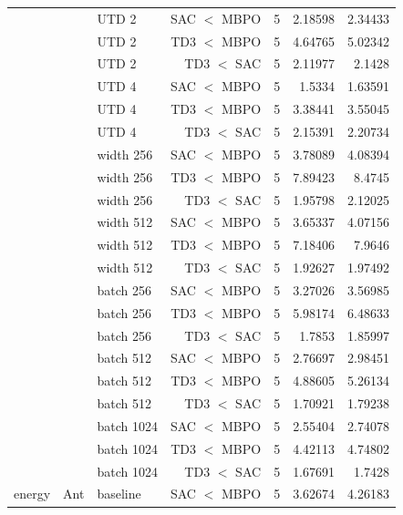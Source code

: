 {\begin{longtable}{@{}lllrrrr@{}}
     &  & UTD 2 & SAC $<$ MBPO & \num{5} & \num{2.18598} & \num{2.34433} \\
     &  & UTD 2 & TD3 $<$ MBPO & \num{5} & \num{4.64765} & \num{5.02342} \\
     &  & UTD 2 & TD3 $<$ SAC & \num{5} & \num{2.11977} & \num{2.1428} \\
     &  & UTD 4 & SAC $<$ MBPO & \num{5} & \num{1.5334} & \num{1.63591} \\
     &  & UTD 4 & TD3 $<$ MBPO & \num{5} & \num{3.38441} & \num{3.55045} \\
     &  & UTD 4 & TD3 $<$ SAC & \num{5} & \num{2.15391} & \num{2.20734} \\
     &  & width 256 & SAC $<$ MBPO & \num{5} & \num{3.78089} & \num{4.08394} \\
     &  & width 256 & TD3 $<$ MBPO & \num{5} & \num{7.89423} & \num{8.4745} \\
     &  & width 256 & TD3 $<$ SAC & \num{5} & \num{1.95798} & \num{2.12025} \\
     &  & width 512 & SAC $<$ MBPO & \num{5} & \num{3.65337} & \num{4.07156} \\
     &  & width 512 & TD3 $<$ MBPO & \num{5} & \num{7.18406} & \num{7.9646} \\
     &  & width 512 & TD3 $<$ SAC & \num{5} & \num{1.92627} & \num{1.97492} \\
     &  & batch 256 & SAC $<$ MBPO & \num{5} & \num{3.27026} & \num{3.56985} \\
     &  & batch 256 & TD3 $<$ MBPO & \num{5} & \num{5.98174} & \num{6.48633} \\
     &  & batch 256 & TD3 $<$ SAC & \num{5} & \num{1.7853} & \num{1.85997} \\
     &  & batch 512 & SAC $<$ MBPO & \num{5} & \num{2.76697} & \num{2.98451} \\
     &  & batch 512 & TD3 $<$ MBPO & \num{5} & \num{4.88605} & \num{5.26134} \\
     &  & batch 512 & TD3 $<$ SAC & \num{5} & \num{1.70921} & \num{1.79238} \\
     &  & batch 1024 & SAC $<$ MBPO & \num{5} & \num{2.55404} & \num{2.74078} \\
     &  & batch 1024 & TD3 $<$ MBPO & \num{5} & \num{4.42113} & \num{4.74802} \\
     &  & batch 1024 & TD3 $<$ SAC & \num{5} & \num{1.67691} & \num{1.7428} \\
    \midrule
    energy & Ant & baseline & SAC $<$ MBPO & \num{5} & \num{3.62674} & \num{4.26183} \\

\end{longtable}}
